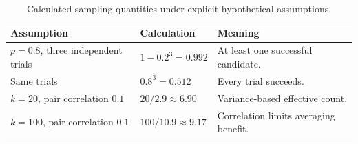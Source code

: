{\small\setlength{\tabcolsep}{3pt}
\begin{table}[!htbp]
\centering
\caption{Calculated sampling quantities under explicit hypothetical assumptions.}\label{tab:C09:sampling}
\begin{tabular}{L{31mm}L{34mm}L{41mm}}

\toprule Assumption & Calculation & Meaning\\\midrule
$p=0.8$, three independent trials & $1-0.2^3=0.992$ & At least one successful candidate.\\
Same trials & $0.8^3=0.512$ & Every trial succeeds.\\
$k=20$, pair correlation $0.1$ & $20/2.9\approx6.90$ & Variance-based effective count.\\
$k=100$, pair correlation $0.1$ & $100/10.9\approx9.17$ & Correlation limits averaging benefit.\\
\bottomrule
\end{tabular}
\end{table}
}

